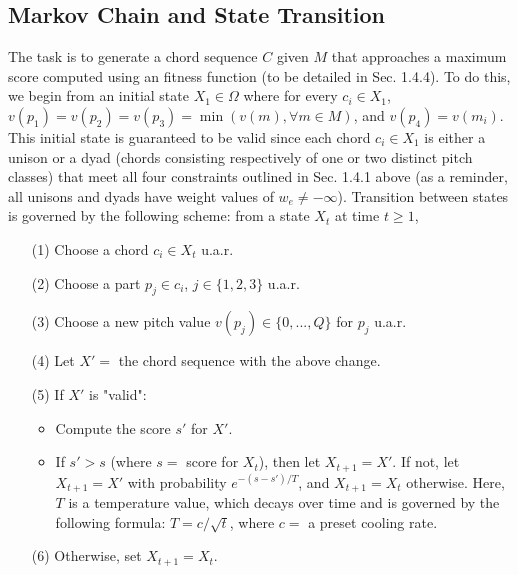 \documentclass[twoside]{article}
\begin{document}
	
	\subsection{Markov Chain and State Transition}
	The task is to generate a chord sequence $C$ given $M$ that approaches a maximum score computed using an fitness function (to be detailed in Sec. 1.4.4). To do this, we begin from an initial state $X_1 \in \Omega$ where for every $c_i \in X_1$, $v(p_1)=v(p_2)=v(p_3)=\min(v(m), \forall m \in M)$, and $v(p_4)=v(m_i)$. This initial state is guaranteed to be valid since each chord $c_i \in X_1$ is either a unison or a dyad (chords consisting respectively of one or two distinct pitch classes) that meet all four constraints outlined in Sec. 1.4.1 above (as a reminder, all unisons and dyads have weight values of $w_e \neq -\infty$). Transition between states is governed by the following scheme: from a state $X_t$ at time $t \geq 1$,
	\begin{enumerate}
		\item[(1)]
		Choose a chord $c_i \in X_t$ u.a.r.
		\item[(2)]
		Choose a part $p_j \in c_i$, $j \in \{1,2,3\}$ u.a.r.
		\item[(3)]
		Choose a new pitch value $v(p_j) \in \{0,...,Q\}$ for $p_j$ u.a.r.
		\item[(4)]
		Let $X'=$ the chord sequence with the above change.
		\item[(5)]
		If $X'$ is "valid":
		\begin{itemize}
			\item 
			Compute the score $s'$ for $X'$. 
			\item 
			If $s' > s$ (where $s=$ score for $X_t$), then let $X_{t+1} = X'$. If not, let $X_{t+1} = X'$ with probability $e^{-(s - s')/T}$, and $X_{t+1} = X_t$ otherwise. Here, $T$ is a temperature value, which decays over time and is governed by the following formula: $T = c / \sqrt{t}$, where $c=$ a preset cooling rate.
		\end{itemize}
		\item[(6)]
		Otherwise, set $X_{t+1} = X_t$.
	\end{enumerate}
\end{document}

